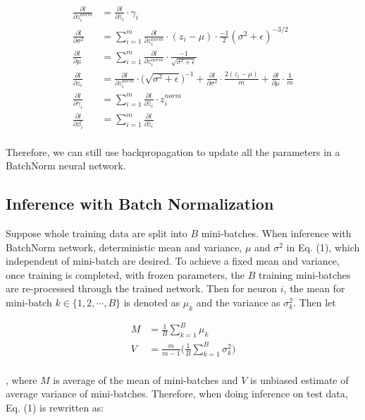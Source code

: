 \documentclass{article}
\begin{document}
\begin{align*}
   \frac{\partial l}{\partial z_i^{norm}} &= \frac{\partial l}{\partial \hat{z}_i}\cdot\gamma_i\\
   \frac{\partial l}{\partial \sigma^2}  &= \sum_{i=1}^m\frac{\partial l}{\partial z_i^{norm}}\cdot(z_i-\mu)\cdot\frac{-1}{2}(\sigma^2+\epsilon)^{-3/2} \\
   \frac{\partial l}{\partial \mu}  &= \sum_{i=1}^m\frac{\partial l}{\partial z_i^{norm}}\cdot \frac{-1}{\sqrt{\sigma^2+\epsilon}}\\
   \frac{\partial l}{\partial z_i}  &=  \frac{\partial l}{\partial z_i^{norm}} \cdot\bigg(\sqrt{\sigma^2+\epsilon}\bigg)^{-1} + \frac{\partial l}{\partial \sigma^2}\cdot\frac{2(z_i-\mu)}{m} +  \frac{\partial l}{\partial \mu}\cdot\frac{1}{m}\\
   \frac{\partial l}{\partial \gamma_i}  &=  \sum_{i=1}^m\frac{\partial l}{\partial \hat{z}_i}\cdot z_i^{norm} \\
   \frac{\partial l}{\partial \beta_i}  &= \sum_{i=1}^m\frac{\partial l}{\partial \hat{z}_i} \\
\end{align*}

Therefore, we can still use backpropagation to update all the parameters in a BatchNorm neural network.

\subsection{Inference with Batch Normalization}

Suppose whole training data are split into $B$ mini-batches. When inference with BatchNorm network, deterministic mean and variance, $\mu$ and $\sigma^2$ in Eq. (1), which independent of mini-batch are desired. To achieve a fixed mean and variance, once training is completed, with frozen parameters, the $B$ training mini-batches are re-processed through the trained network. Then for neuron $i$, the mean for mini-batch $k\in\{1,2,\cdots,B\}$ is denoted as $\mu_k$ and the variance as $\sigma^2_k$. Then let

\begin{align*}
   M &= \frac{1}{B}\sum_{k=1}^B\mu_k\\
   V &= \frac{m}{m-1}\Bigg(\frac{1}{B}\sum_{k=1}^B\sigma^2_k\Bigg)\\
\end{align*}

, where $M$ is average of the mean of mini-batches and $V$ is unbiased estimate of average variance of mini-batches. Therefore, when doing inference on test data, Eq. (1) is rewritten as:
\end{document}
